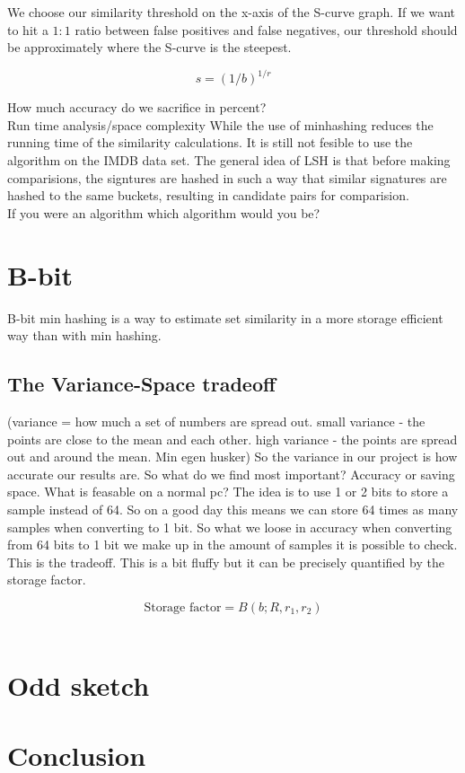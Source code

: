 \documentclass[a4paper,11pt]{article}
\begin{document}
We choose our similarity threshold on the x-axis of the S-curve graph. If we want to hit a $1:1$ ratio between false positives and false negatives, our threshold should be approximately where the S-curve is the steepest. 

\begin{equation}
    s = (1/b)^{1/r}
    \label{eq:s-estimate}
\end{equation}


How much accuracy do we sacrifice in percent?\\

Run time analysis/space complexity
While the use of minhashing reduces the running time of the similarity calculations. It is still not fesible to use the algorithm on the IMDB data set. The general idea of LSH is that before making comparisions, the signtures are hashed in such a way that similar signatures are hashed to the same buckets, resulting in candidate pairs for comparision.\\

If you were an algorithm which algorithm would you be?

\section{B-bit}
B-bit min hashing is a way to estimate set similarity in a more storage efficient way than with min hashing.
\subsection{The Variance-Space tradeoff}
(variance = how much a set of numbers are spread out. small variance - the points are close to the mean and each other. high variance - the points are spread out and around the mean. Min egen husker) So the variance in our project is how accurate our results are. So what do we find most important? Accuracy or saving space. What is feasable on a normal pc? The idea is to use 1 or 2 bits to store a sample instead of 64. So on a good day this means we can store 64 times as many samples when converting to 1 bit. So what we loose in accuracy when converting from 64 bits to 1 bit we make up in the amount of samples it is possible to check. This is the tradeoff. This is a bit fluffy but it can be precisely quantified by the storage factor. 

\begin{equation}
    \text {Storage factor} = B(b;R,r_1,r_2)
\end{equation}\\

\section{Odd sketch}

\section{Conclusion}
\newpage

\end{document}
